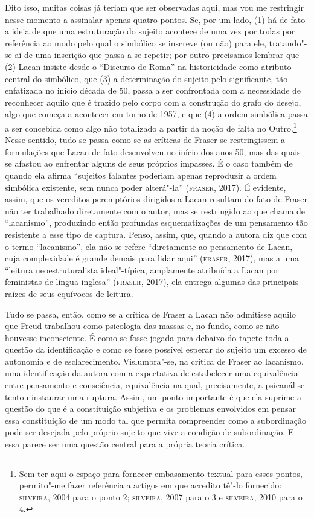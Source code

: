 Dito isso, muitas coisas já teriam que ser observadas aqui, mas vou me
restringir nesse momento a assinalar apenas quatro pontos. Se, por um
lado, (1) há de fato a ideia de que uma estruturação do sujeito acontece
de uma vez por todas por referência ao modo pelo qual o simbólico se
inscreve (ou não) para ele, tratando"-se aí de uma inscrição que passa a
se repetir; por outro precisamos lembrar que (2) Lacan insiste desde o
``Discurso de Roma'' na historicidade como atributo central do
simbólico, que (3) a determinação do sujeito pelo significante, tão
enfatizada no início década de 50, passa a ser confrontada com a
necessidade de reconhecer aquilo que é trazido pelo corpo com a
construção do grafo do desejo, algo que começa a acontecer em torno de
1957, e que (4) a ordem simbólica passa a ser concebida como algo não
totalizado a partir da noção de falta no Outro.\footnote{Sem ter aqui o
  espaço para fornecer embasamento textual para esses pontos, permito"-me
  fazer referência a artigos em que acredito tê"-lo fornecido: \textsc{silveira},
  2004 para o ponto 2; \textsc{silveira}, 2007 para o 3 e \textsc{silveira}, 2010 para o 4.}
Nesse sentido, tudo se passa como se as críticas de Fraser se
restringissem a formulações que Lacan de fato desenvolveu no início dos
anos 50, mas das quais se afastou ao enfrentar alguns de seus próprios
impasses. É o caso também de quando ela afirma ``sujeitos falantes
poderiam apenas reproduzir a ordem simbólica existente, sem nunca poder
alterá"-la'' (\textsc{fraser}, 2017). É evidente, assim, que os vereditos
peremptórios dirigidos a Lacan resultam do fato de Fraser não ter
trabalhado diretamente com o autor, mas se restringido ao que chama de
``lacanismo'', produzindo então profundas esquematizações de um
pensamento tão resistente a esse tipo de captura. Penso, assim, que,
quando a autora diz que com o termo ``lacanismo'', ela não se refere
``diretamente ao pensamento de Lacan, cuja complexidade é grande
demais para lidar aqui'' (\textsc{fraser}, 2017), mas a uma ``leitura
neoestruturalista ideal"-típica, amplamente atribuída a Lacan por
feministas de língua inglesa'' (\textsc{fraser}, 2017), ela entrega algumas das
principais raízes de seus equívocos de leitura.

Tudo se passa, então, como se a crítica de Fraser a Lacan não admitisse
aquilo que Freud trabalhou como psicologia das massas e, no fundo, como
se não houvesse inconsciente. É como se fosse jogada para debaixo do
tapete toda a questão da identificação e como se fosse possível esperar
do sujeito um excesso de autonomia e de esclarecimento. Vislumbra"-se, na
crítica de Fraser ao lacanismo, uma identificação da autora com a
expectativa de estabelecer uma equivalência entre pensamento e
consciência, equivalência na qual, precisamente, a psicanálise tentou
instaurar uma ruptura. Assim, um ponto importante é que ela suprime a
questão do que é a constituição subjetiva e os problemas envolvidos em
pensar essa constituição de um modo tal que permita compreender como a
subordinação pode ser desejada pelo próprio sujeito que vive a condição
de subordinação. E essa parece ser uma questão central para a própria
teoria crítica.

